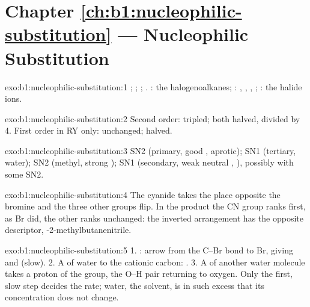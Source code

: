 \section*{Chapter \ref{ch:b1:nucleophilic-substitution} --- Nucleophilic Substitution}

\begin{solution}{exo:b1:nucleophilic-substitution:1}
; ; ;
. : the halogenoalkanes; :
, , , ; : the halide ions.
\end{solution}

\begin{solution}{exo:b1:nucleophilic-substitution:2}
Second order: tripled; both halved, divided by 4. First order in RY only:
unchanged; halved.
\end{solution}

\begin{solution}{exo:b1:nucleophilic-substitution:3}
SN2 (primary, good , aprotic); SN1 (tertiary, water); SN2
(methyl, strong ); SN1  (secondary, weak neutral
, ), possibly with some SN2.
\end{solution}

\begin{solution}{exo:b1:nucleophilic-substitution:4}
The cyanide takes the place opposite the bromine and the three other
groups flip. In the product the CN group ranks first, as Br did, the
other ranks unchanged: the inverted arrangement has the opposite
descriptor, -2-methylbutanenitrile.
\end{solution}

\begin{solution}{exo:b1:nucleophilic-substitution:5}
1. : arrow from the C--Br bond to Br, giving  and
 (slow). 2. A  of water to the cationic carbon:
. 3. A  of another water molecule takes a proton
of the  group, the O--H pair returning to oxygen. Only the first,
slow step decides the rate; water, the solvent, is in such excess that
its concentration does not change.
\end{solution}

